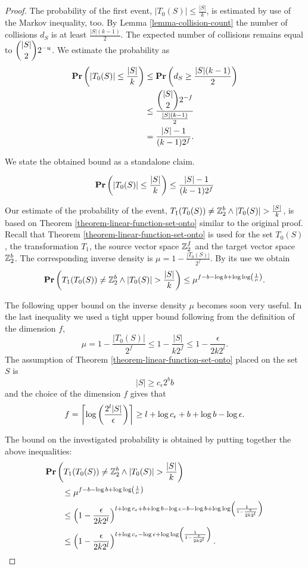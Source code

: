 \begin{proof}
The probability of the first event, $|T_0(S)| \leq \frac{|S|}{k}$, is estimated by use of the Markov inequality, too. By Lemma \ref{lemma-collision-count} the number of collisions $d_S$ is at least $\frac{|S|(k - 1)}{2}$. The expected number of collisions remains equal to $\dbinom{|S|}{2}2 ^ {-u}$. We estimate the probability as 
\[
\begin{split}
\mathbf{Pr}\left(|T_0(S)| \leq \frac{|S|}{k}\right) 
	& \leq \mathbf{Pr}\left(d_S \geq \frac{|S|(k - 1)}{2}\right) \\
	& \leq \frac{\dbinom{|S|}{2}2 ^ {-f}}{\frac{|S|(k - 1)}{2}} \\
	& = \frac{|S| - 1}{(k - 1) 2 ^ f} \text{.}
\end{split}
\]

We state the obtained bound as a standalone claim.
\begin{claim}
\label{claim-event-1}
\[
	\mathbf{Pr}\left(|T_0(S)| \leq \frac{|S|}{k}\right) \leq \frac{|S| - 1}{(k - 1) 2 ^ f}
\]
\end{claim}

Our estimate of the probability of the event, $T_1(T_0(S)) \neq \mathbb{Z}_{2}^{b} \wedge |T_0(S)| > \frac{|S|}{k}$, is based on Theorem \ref{theorem-linear-function-set-onto} similar to the original proof. Recall that Theorem \ref{theorem-linear-function-set-onto} is used for the set $T_0(S)$, the transformation $T_1$, the source vector space $\mathbb{Z}_{2}^{f}$ and the target vector space $\mathbb{Z}_{2}^{b}$. The corresponding inverse density is $\mu = 1 - \frac{|T_0(S)|}{2 ^ f}$. By its use we obtain
\[
\mathbf{Pr}\left(T_1(T_0(S)) \neq \mathbb{Z}_{2}^{b} \wedge |T_0(S)| > \frac{|S|}{k}\right) \leq \mu ^ {f - b - \log b + \log \log \left(\frac{1}{\mu}\right)} \text{.}
\]

The following upper bound on the inverse density $\mu$ becomes soon very useful. In the last inequality we used a tight upper bound following from the definition of the dimension $f$,
\[
	\mu = 1 - \frac{|T_0(S)|}{2 ^ f} \leq 1 - \frac{|S|}{k 2 ^ f} \leq 1 - \frac{\epsilon}{2 k 2 ^ l} \text{.}
\]
The assumption of Theorem \ref{theorem-linear-function-set-onto} placed on the set $S$ is
\[
	|S| \geq c_\epsilon 2 ^ b b 
\]
and the choice of the dimension $f$ gives that 
\[
	f = \left\lceil \log \left(\frac{2^l |S|}{\epsilon}\right) \right\rceil \geq l + \log c_\epsilon + b + \log b - \log \epsilon \text{.} \\
\]

The bound on the investigated probability is obtained by putting together the above inequalities:
\[
\begin{split}
& \mathbf{Pr}\left(T_1(T_0(S)) \neq \mathbb{Z}_{2}^{b} \wedge |T_0(S)| > \frac{|S|}{k}\right) \\
	& \qquad \leq \mu ^ {f - b - \log b + \log \log \left(\frac{1}{\mu}\right)} \\
	& \qquad \leq \left(1 - \frac{\epsilon}{2 k 2 ^ l}\right)^{l + \log c_\epsilon + b + \log b - \log \epsilon - b - \log b + \log \log \left(\frac{1}{1 - \frac{\epsilon}{2 k 2 ^ l}}\right)} \\
	& \qquad \leq \left(1 - \frac{\epsilon}{2 k 2 ^ l}\right)^{l + \log c_\epsilon - \log \epsilon + \log \log \left(\frac{1}{1 - \frac{\epsilon}{2 k 2 ^ l}}\right)} \text{.}
\end{split}
\]


\end{proof}
